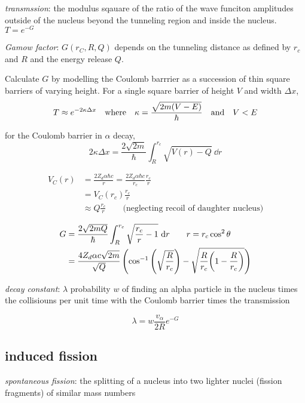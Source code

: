\documentclass[10pt, a4paper, twocolumn]{article}
\newcommand{\deff}[1]{\par \noindent \textit{#1}: }
\begin{document}
\deff{transmssion}
the modulus sqauare of the ratio of the wave funciton amplitudes outside of the nucleus beyond the tunneling region and inside the nucleus. $T=e^{-G}$

\deff{Gamow factor}
$G(r_C,R,Q)$ depends on the tunneling distance as defined by $r_c$ and $R$ and the energy release $Q$.

Calculate $G$ by modelling the Coulomb barrrier as a succession of thin square barriers of varying height. For a single square barrier of height $V$ and width $\Delta x$,
\[T\approx e^{-2\kappa \Delta x}
\qq{where} \kappa = \frac{\sqrt{2m(V-E)}}{\hbar}
\qq{and} V<E\]

for the Coulomb barrier in $\alpha$ decay,
\[2\kappa\Delta x
=\frac{2\sqrt{2m}}{\hbar}
\int _R^{r_c} \sqrt{V(r) -Q}\ \dd r\]

\begin{equation*}
\begin{aligned}
V_C(r)&=\frac{2Z_d\alpha\hbar c}{r}
=\frac{2Z_d\alpha\hbar c}{r_c}\frac{r_c}{r}
\\&=V_C(r_c)\frac{r_c}{r}
\\&\approx Q\frac{r_c}{r}
\qquad\text{(neglecting recoil of daughter nucleus)}
\end{aligned}
\end{equation*}

\begin{equation*}
\begin{aligned}
G&=\frac{2\sqrt{2mQ}}{\hbar}
\int _R^{r_c}\sqrt{\frac{r_c}{r} -1}\ \dd r
\qquad r=r_c\cos ^2\theta
\\&=\frac{4Z_d\alpha c\sqrt{2m}}{\sqrt Q}
\left(
\cos^{-1}\pqty{\sqrt{\frac{R}{r_c}}}
-\sqrt{\frac{R}{r_c}\pqty{1-\frac{R}{r_c}}}
\right)
\end{aligned}
\end{equation*}

\deff{decay constant} $\lambda$
probability $w$ of finding an alpha particle in the nucleus times the collisiouns per unit time with the Coulomb barrier times the transmission

\[\lambda = w\frac{v_\alpha}{2R}e^{-G}\]

\subsection{induced fission}

\deff{spontaneous fission}
the splitting of a nucleus into two lighter nuclei (fission fragments) of similar mass numbers
\end{document}
